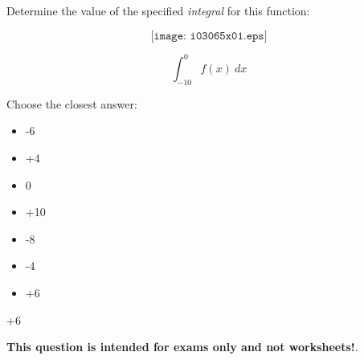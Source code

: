 

Determine the value of the specified {\it integral} for this function:

$$\texttt{[image: i03065x01.eps]}$$

$$\int_{-10}^{0} f(x) \> dx$$

Choose the closest answer:

\begin{itemize}
\item{} -6
\vskip 10pt 
\item{} +4
\vskip 10pt 
\item{} 0
\vskip 10pt 
\item{} +10
\vskip 10pt 
\item{} -8
\vskip 10pt 
\item{} -4
\vskip 10pt 
\item{} +6
\end{itemize}








+6






{\bf This question is intended for exams only and not worksheets!}.



